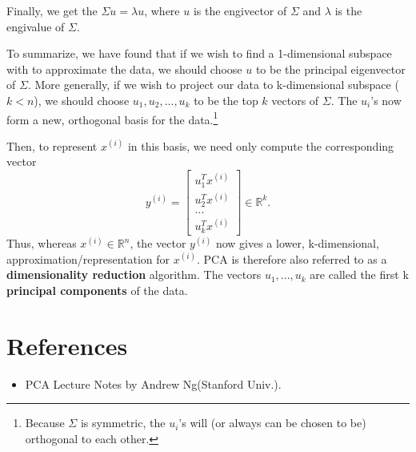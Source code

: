 \documentclass[a4paper]{article}
\begin{document}
Finally, we get the $\Sigma u = \lambda u$, where $u$ is the engivector of $\Sigma$ and $\lambda$ is the engivalue of  $\Sigma$.

To summarize, we have found that if we wish to find a 1-dimensional subspace with to approximate the data, we should choose $u$ to be the principal eigenvector of $\Sigma$. More generally, if we wish to project our data to k-dimensional subspace ($k<n$), we should choose $u_1, u_2, ..., u_k$ to be the top $k$ vectors of $\Sigma$. The $u_i$'s now form a new, orthogonal basis for the data.\footnote{Because $\Sigma$ is symmetric, the $u_i$'s will (or always can be chosen to be) orthogonal to each other.}

Then, to represent $x^{(i)}$ in this basis, we need only compute the corresponding vector
$$
	y^{(i)} = \begin{bmatrix} 
	u_1^Tx^{(i)} \\
	u_2^Tx^{(i)} \\
	... \\
	u_k^Tx^{(i)} \end{bmatrix}
	\in \mathbb{R}^{k}.
$$
Thus, whereas $x^{(i)} \in \mathbb{R}^n$, the vector $y^{(i)}$ now gives a lower, k-dimensional, approximation/representation for $x^{(i)}$. PCA is therefore also referred to as a \textbf{dimensionality reduction} algorithm. The vectors $u_1, ..., u_k$ are called the first k \textbf{principal components} of the data.

\section{References}

\begin{itemize}
    \item PCA Lecture Notes by Andrew Ng(Stanford Univ.).    
\end{itemize}
\end{document}
